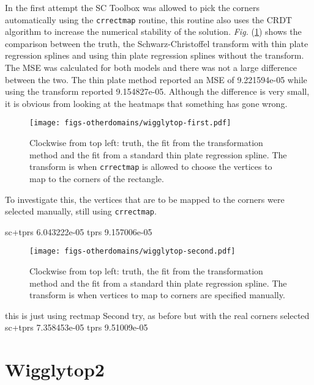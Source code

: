 \documentclass[a4paper,10pt]{amsart}
\newcommand{\sch}{Schwarz-Christoffel }
\newcommand{\Fig}[1]{\emph{Fig.} (\ref{#1})}
\begin{document}
In the first attempt the SC Toolbox was allowed to pick the corners automatically using the \texttt{crrectmap} routine, this routine also uses the CRDT algorithm to increase the numerical stability of the solution. \Fig{wigglyfirstcomp} shows the comparison between the truth, the \sch transform with thin plate regression splines and using thin plate regression splines without the transform. The MSE was calculated for both models and there was not a large difference between the two. The thin plate method reported an MSE of 9.221594e-05 while using the transform reported 9.154827e-05. Although the difference is very small, it is obvious from looking at the heatmaps that something has gone wrong.

\begin{figure}
\centering
\texttt{[image: figs-otherdomains/wigglytop-first.pdf]} \\
\caption{Clockwise from top left: truth, the fit from the transformation method and the fit from a standard thin plate regression spline. The transform is when \texttt{crrectmap} is allowed to choose the vertices to map to the corners of the rectangle.}
\label{wigglyfirstcomp}
\end{figure}

To investigate this, the vertices that are to be mapped to the corners were selected manually, still using \texttt{crrectmap}. 

sc+tprs 6.043222e-05 
tprs 9.157006e-05 


\begin{figure}
\centering
\texttt{[image: figs-otherdomains/wigglytop-second.pdf]} \\
\caption{Clockwise from top left: truth, the fit from the transformation method and the fit from a standard thin plate regression spline. The transform is when vertices to map to corners are specified manually.}
\label{wigglyseccomp}
\end{figure}




this is just using rectmap
Second try, as before but with the real corners selected
sc+tprs 7.358453e-05 
tprs 9.51009e-05 




\section{Wigglytop2}










\end{document}

